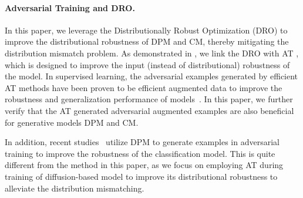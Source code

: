\paragraph{Adversarial Training and DRO.} In this paper, we leverage the Distributionally Robust Optimization (DRO) \citep{shapiro2017distributionally,namkoong2019reliable,yi2021improved,sinha2018certifying,wang2022out,yi2023breaking} to improve the distributional robustness of DPM and CM, thereby mitigating the distribution mismatch problem. As demonstrated in \citep{sinha2018certifying,yi2021improved,lee2018minimax}, we link the DRO with AT \citep{madry2018towards,fgsm}, which is designed to improve the input (instead of distributional) robustness of the model. In supervised learning, the adversarial examples generated by efficient AT methods \citep{freeat, yopo, zhang2019theoretically, freelb, jiang2020smart} have been proven to be efficient augmented data to improve the robustness and generalization performance of models~\citep{rebuffi2021fixing, awp, yi2021improved}. In this paper, we further verify that the AT generated adversarial augmented examples are also beneficial for generative models DPM and CM.  

In addition, recent studies~\citep{nie2022diffusion, wang2023better,zhang2023enhancing} utilize DPM to generate examples in adversarial training to improve the robustness of the classification model. This is quite different from the method in this paper, as we focus on employing AT during training of diffusion-based model to improve its distributional robustness to alleviate the distribution mismatching. 

